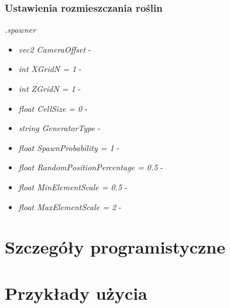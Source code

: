 \documentclass[inz,longabstract]{iithesis}
\begin{document}
        \subsection{Ustawienia rozmieszczania roślin}
        \textit{.spawner}
        \begin{itemize}
            \item \textit{vec2 CameraOffset} -
            \item \textit{int XGridN = 1} -
            \item \textit{int ZGridN = 1} -
            \item \textit{float CellSize = 0} -
            \item \textit{string GeneratorType} -
            \item \textit{float SpawnProbability = 1} -
            \item \textit{float RandomPositionPercentage = 0.5} -
            \item \textit{float MinElementScale = 0.5} -
            \item \textit{float MaxElementScale = 2} -
        \end{itemize}
        
\chapter{Szczegóły programistyczne}

\chapter{Przykłady użycia}





\end{document}
